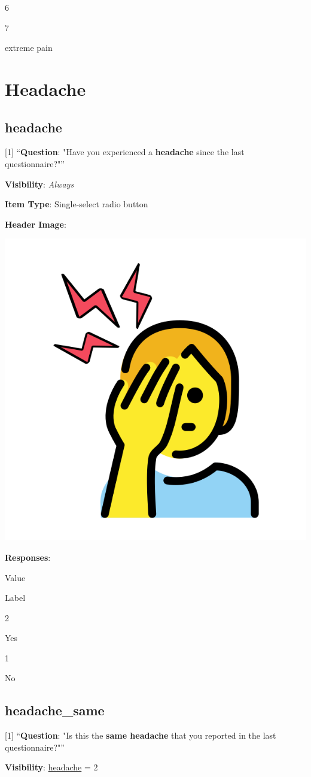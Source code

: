 \documentclass[]{book}
\begin{document}
6

7

extreme pain

\hypertarget{headache_section}{%
\chapter{Headache}\label{headache_section}}

\hypertarget{headache}{%
\section{headache}\label{headache}}

{[}1{]} ``\textbf{Question}: "Have you experienced a \textbf{headache} since the last questionnaire?"''

\textbf{Visibility}: \emph{Always}

\textbf{Item Type}: Single-select radio button

\textbf{Header Image}:

\begin{flushleft}\includegraphics[width=0.33\linewidth]{downloadFigs4latex_NIMH_Applet_Codebook/headache_headerImg} \end{flushleft}

\textbf{Responses}:

Value

Label

2

Yes

1

No

\hypertarget{headache_same}{%
\section{headache\_same}\label{headache_same}}

{[}1{]} ``\textbf{Question}: "Is this the \textbf{same headache} that you reported in the last questionnaire?"''

\textbf{Visibility}: \protect\hyperlink{headache}{headache} = 2
\end{document}
